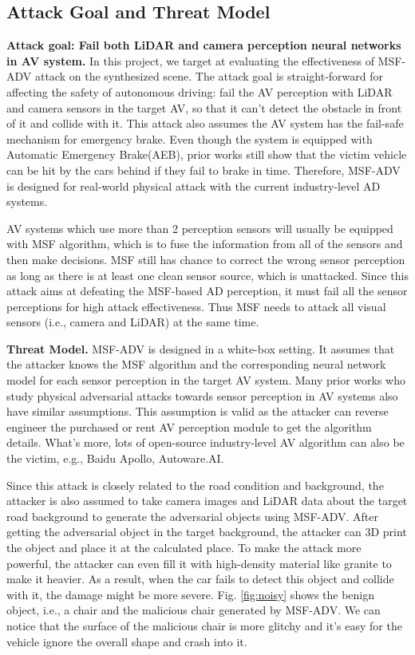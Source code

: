 \subsection{Attack Goal and Threat Model}
\textbf{Attack goal: Fail both LiDAR and camera perception neural networks in AV system.}
In this project, we target at evaluating the effectiveness of MSF-ADV\cite{msf-adv} attack on the synthesized scene.
The attack goal is straight-forward for affecting the safety of autonomous driving: 
fail the AV perception with LiDAR and camera sensors in the target AV, so that it can't detect the obstacle in front of it and collide with it.
This attack also assumes the AV system has the fail-safe mechanism for emergency brake. 
Even though the system is equipped with Automatic Emergency Brake(AEB), 
prior works still show that the victim vehicle can be hit by the cars behind if they fail to brake in time.
Therefore, MSF-ADV is designed for real-world physical attack with the current industry-level AD systems.

AV systems which use more than 2 perception sensors will usually be equipped with MSF algorithm,
which is to fuse the information from all of the sensors and then make decisions.
MSF still has chance to correct the wrong sensor perception as long as there is at least one clean sensor source, which is unattacked.
Since this attack aims at defeating the MSF-based AD perception, it must fail all the sensor perceptions for high attack effectiveness.
Thus MSF needs to attack all visual sensors (i.e., camera and LiDAR) at the same time.

\textbf{Threat Model.} 
MSF-ADV\cite{msf-adv} is designed in a white-box setting. 
It assumes that the attacker knows the MSF algorithm and the corresponding neural network model for each sensor perception in the target AV system.
Many prior works who study physical adversarial attacks towards sensor perception in AV systems also have similar assumptions\cite{adv1, adv2}. 
This assumption is valid as the attacker can reverse engineer the purchased or rent AV perception module to get the algorithm details.
What's more, lots of open-source industry-level AV algorithm can also be the victim, e.g., Baidu Apollo\cite{apollo}, Autoware.AI\cite{autoware}.

Since this attack is closely related to the road condition and background, 
the attacker is also assumed to take camera images and LiDAR data about the target road background to generate the adversarial objects using MSF-ADV.
After getting the adversarial object in the target background, the attacker can 3D print the object and place it at the calculated place.
To make the attack more powerful, the attacker can even fill it with high-density material like granite to make it heavier.
As a result, when the car fails to detect this object and collide with it, the damage might be more severe.
Fig. \ref{fig:noisy} shows the benign object, i.e., a chair and the malicious chair generated by MSF-ADV\cite{msf-adv}. We can notice that the surface of the malicious chair is more glitchy and it's easy for the vehicle ignore the overall shape and crash into it.

